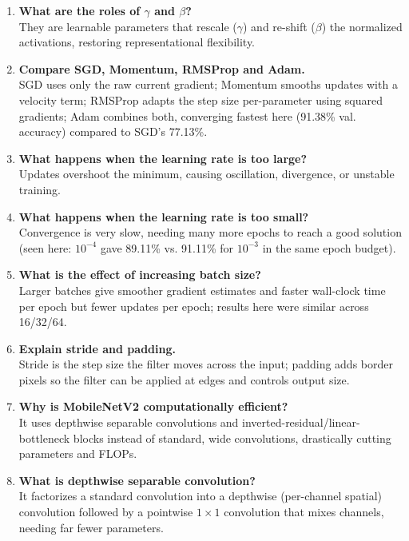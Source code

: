 \documentclass[10pt]{article}
\begin{document}
\begin{enumerate}
\item \textbf{What are the roles of $\gamma$ and $\beta$?}\\
They are learnable parameters that rescale ($\gamma$) and re-shift ($\beta$) the normalized activations, restoring representational flexibility.

\item \textbf{Compare SGD, Momentum, RMSProp and Adam.}\\
SGD uses only the raw current gradient; Momentum smooths updates with a velocity term; RMSProp adapts the step size per-parameter using squared gradients; Adam combines both, converging fastest here (91.38\% val. accuracy) compared to SGD's 77.13\%.

\item \textbf{What happens when the learning rate is too large?}\\
Updates overshoot the minimum, causing oscillation, divergence, or unstable training.

\item \textbf{What happens when the learning rate is too small?}\\
Convergence is very slow, needing many more epochs to reach a good solution (seen here: $10^{-4}$ gave 89.11\% vs. 91.11\% for $10^{-3}$ in the same epoch budget).

\item \textbf{What is the effect of increasing batch size?}\\
Larger batches give smoother gradient estimates and faster wall-clock time per epoch but fewer updates per epoch; results here were similar across 16/32/64.

\item \textbf{Explain stride and padding.}\\
Stride is the step size the filter moves across the input; padding adds border pixels so the filter can be applied at edges and controls output size.

\item \textbf{Why is MobileNetV2 computationally efficient?}\\
It uses depthwise separable convolutions and inverted-residual/linear-bottleneck blocks instead of standard, wide convolutions, drastically cutting parameters and FLOPs.

\item \textbf{What is depthwise separable convolution?}\\
It factorizes a standard convolution into a depthwise (per-channel spatial) convolution followed by a pointwise $1\times1$ convolution that mixes channels, needing far fewer parameters.


\end{enumerate}
\end{document}
